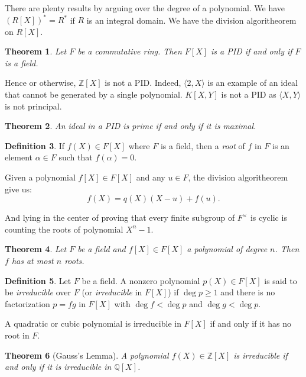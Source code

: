 \documentclass[12pt]{report}
\newtheorem{theorem}{Theorem}[section]
\theoremstyle{definition}
\newtheorem{definition}[theorem]{Definition}
\newcommand{\ZZ}{\mathbb{Z}}
\newcommand{\QQ}{\mathbb{Q}}
\begin{document}
There are plenty results by arguing over the degree of a polynomial. We have $(R[X])^* =  R^*$ if $R$ is an integral domain. We have the division algoritheorem on $R[X]$.

\begin{theorem}
	Let $F$ be a commutative ring. Then $F[X]$ is a PID if and only if $F$ is a field.
\end{theorem}

Hence or otherwise, $\ZZ[X]$ is not a PID. Indeed, $\langle 2, X\rangle$ is an example of an ideal that cannot be generated by a single polynomial. $K[X,Y]$ is not a PID as $\langle X, Y \rangle$ is not principal.

\begin{theorem}
	An ideal in a PID is prime if and only if it is maximal.
\end{theorem}

\smallskip

\begin{definition}
	If $f(X)\in F[X]$ where $F$ is a field, then a \emph{root} of $f$ in $F$ is an element $\alpha\in F$ such that $f(\alpha)=0$.
\end{definition}

Given a polynomial $f[X]\in F[X]$ and any $u\in F$, the division algoritheorem give us: $$f(X)= q(X)(X-u)+f(u).$$

And lying in the center of proving that every finite subgroup of $F^\times$ is cyclic is counting the roots of polynomial $X^n-1$.

\begin{theorem}
	Let $F$ be a field and $f[X]\in F[X]$ a polynomial of degree $n$. Then $f$ has at most $n$ roots.
\end{theorem}

\begin{definition}
	Let $F$ be a field. A nonzero polynomial $p(X) \in F[X]$ is said to be \emph{irreducible} over $F$ (or \emph{irreducible} in $F[X]$) if $\deg p \geq 1$ and there is no factorization $p=fg$ in $F[X]$ with $\deg f < \deg p$ and $\deg g < \deg p$.
\end{definition}

A quadratic or cubic polynomial is irreducible in $F[X]$ if and only if it has no root in $F$.

\begin{theorem}[Gauss's Lemma]
	A polynomial $f(X)\in \ZZ[X]$ is irreducible if and only if it is irreducible in $\QQ[X]$.
\end{theorem}
\end{document}
